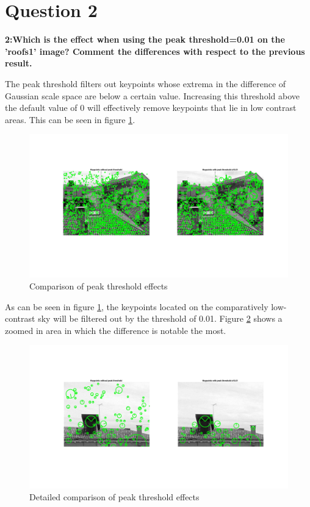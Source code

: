 \section*{Question 2}

{\bfseries 2:Which is the effect when using the peak threshold=0.01 on the
'roofs1' image? Comment the differences with respect to the previous result.}

The peak threshold filters out keypoints whose extrema in the difference of Gaussian scale space are below a certain value. Increasing this threshold above the default value of 0 will effectively remove keypoints that lie in low contrast areas. This can be seen in figure \ref{fig:diff_peak_thresh}.

\begin{figure}[!hbt]
  \includegraphics[width=\textwidth]{img/diff_peak_thresh}
  \caption{Comparison of peak threshold effects}
  \label{fig:diff_peak_thresh}
\end{figure}

As can be seen in figure \ref{fig:diff_peak_thresh}, the keypoints located on the comparatively low-contrast sky will be filtered out by the threshold of 0.01. Figure \ref{fig:diff_peak_thresh2} shows a zoomed in area in which the difference is notable the most.

\begin{figure}[!hbt]
  \includegraphics[width=\textwidth]{img/diff_peak_thresh2}
  \caption{Detailed comparison of peak threshold effects}
  \label{fig:diff_peak_thresh2}
\end{figure}


